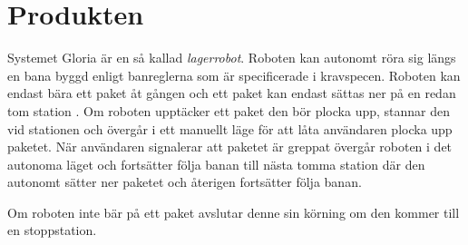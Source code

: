 
\section{Produkten}

Systemet Gloria är en så kallad \textit{lagerrobot}. Roboten kan autonomt röra sig längs en bana byggd enligt banreglerna som är specificerade i kravspecen. Roboten kan endast bära ett paket åt gången och ett paket kan endast sättas ner på en redan tom station . Om roboten upptäcker ett paket den bör plocka upp, stannar den vid stationen och övergår i ett manuellt läge för att låta användaren plocka upp paketet. När användaren signalerar att paketet är greppat övergår roboten i det autonoma läget och fortsätter följa banan till nästa tomma station där den autonomt sätter ner paketet och återigen fortsätter följa banan.

Om roboten inte bär på ett paket avslutar denne sin körning om den kommer till en stoppstation.

